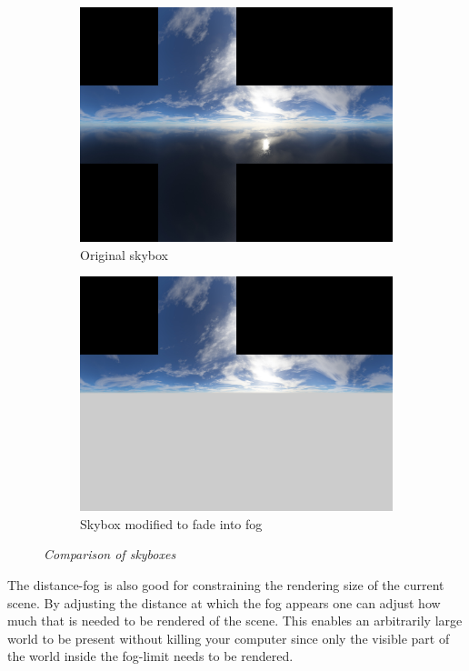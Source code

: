 \begin{figure}[H]
\begin{subfigure}{.5\textwidth}
  \centering
  \includegraphics[width=0.9\linewidth]{images/skybox0.png}
  \caption{Original skybox}
  \label{fig:skybox0}
\end{subfigure}%
\begin{subfigure}{.5\textwidth}
  \centering
  \includegraphics[width=0.9\linewidth]{images/skybox1.png}
  \caption{Skybox modified to fade into fog}
  \label{fig:skybox1}
\end{subfigure}
\caption[Noise comparison]{\textit{Comparison of skyboxes}}
\label{fig:SkyboxComparison}
\end{figure}

The distance-fog is also good for constraining the rendering size of the current scene. By adjusting the distance at which the fog appears one can adjust how much that is needed to be rendered of the scene. This enables an arbitrarily large world to be present without killing your computer since only the visible part of the world inside the fog-limit needs to be rendered. 

